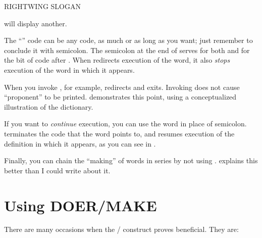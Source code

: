 \begin{Code}
RIGHTWING SLOGAN
\end{Code}
will display another.

The ``'' code can be any \Forth{} code, as much or as long as
you want; just remember to conclude it with semicolon. The semicolon at
the end of  serves for both  and for the bit of
code after . When  redirects execution of the  word,
it also \emph{stops} execution of the word in which it appears.

When you invoke , for example,  redirects
 and exits. Invoking  does not cause ``proponent''
to be printed.  demonstrates this point, using a
conceptualized illustration of the dictionary.


If you want to \emph{continue} execution, you can use the word  in
place of semicolon.  terminates the code that the  word
points to, and resumes execution of the definition in which it appears, as
you can see in .




Finally, you can chain the ``making'' of  words in series by
not using .  explains this better than I could write about it.%


\section{Using DOER/MAKE}

There are many occasions when the / construct proves
beneficial. They are:

